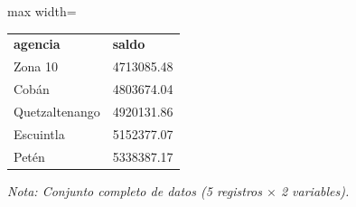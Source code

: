 

\begin{table}[htbp]

\centering

\begin{adjustbox}{max width=\textwidth}

\begin{tabular}{ll}

\rowcolor{ThemeBackground}
\rule{0pt}{0.45cm}
\textcolor{ThemeGold}{\bfseries agencia} & \textcolor{ThemeGold}{\bfseries saldo} \\

Zona 10 & 4713085.48 \\
Cobán & 4803674.04 \\
Quetzaltenango & 4920131.86 \\
Escuintla & 5152377.07 \\
Petén & 5338387.17 \\
\bottomrule
\end{tabular}

\end{adjustbox}

\vspace{0.15cm}
{\raggedright\sffamily\footnotesize\color{ThemeMuted}
\textit{Nota: Conjunto completo de datos (5 registros $\times$ 2 variables).}}

\end{table}
